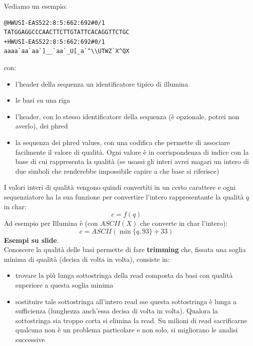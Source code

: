\documentclass[a4paper,12pt, oneside]{book}
\begin{document}
\begin{esempio}
  Vediamo un esempio:
\begin{verbatim}
@HWUSI-EAS522:8:5:662:692#0/1
TATGGAGGCCCAACTTCTTGTATTCACAGGTTCTGC
+HWUSI-EAS522:8:5:662:692#0/1
aaaa`aa`aa`]__`aa`_U[_a`^\\UTWZ`X^QX
\end{verbatim}
  con:
  \begin{itemize}
    \item l'header della sequenza un identificatore tipico di illumina
    \item le basi su una riga
    \item l'header, con lo stesso identificatore della sequenza (è opzionale,
    potrei non averlo), dei phred
    \item la sequenza dei phred values, con una codifica che permette di
    associare facilmente il valore di qualità. Ogni valore è in corrispondenza
    di indice con la base di cui rappresenta la qualità (se usassi gli interi
    avrei magari un intero di due simboli che renderebbe impossibile capire a
    che base si riferisce)
  \end{itemize}
\end{esempio}
I valori interi di qualità vengono quindi convertiti in un certo carattere e
ogni sequenziatore ha la sua funzione per convertire l'intero rappresentante la
qualità $q$ in char:
\[c=f(q)\]
Ad esempio per Illumina è (con $ASCII(X)$ che converte in char l'intero):
\[c=ASCII(\min\{q,93\}+33)\]
\textbf{Esempi su slide}.\\
Conoscere la qualità delle basi permette di fare \textbf{trimming} che, fissata
una soglia minima di qualità (decisa di volta in volta), consiste in:
\begin{itemize}
  \item trovare la più lunga sottostringa della read composta da basi con
  qualità superiore a questa soglia minima
  \item sostituire tale sottostringa all'intero read sse questa sottostringa è
  lunga a sufficienza (lunghezza anch'essa decisa di volta in volta). Qualora la
  sottostringa sia troppo corta si elimina la read. Su milioni di read
  sacrificarne qualcuna non è un problema particolare e non solo, si migliorano
  le analisi successive
\end{itemize}
\end{document}
